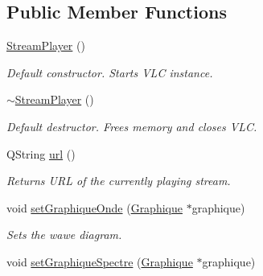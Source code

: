 \subsection*{Public Member Functions}
\begin{DoxyCompactItemize}
\item 
\hypertarget{classStreamPlayer_aba5a4bd0bb0c489e631c1d9aff07db51}{
\hyperlink{classStreamPlayer_aba5a4bd0bb0c489e631c1d9aff07db51}{StreamPlayer} ()}
\label{classStreamPlayer_aba5a4bd0bb0c489e631c1d9aff07db51}

\begin{DoxyCompactList}\small\item\em Default constructor. Starts VLC instance. \item\end{DoxyCompactList}\item 
\hypertarget{classStreamPlayer_a3e93a68113a1a69b912ae92aa18c783e}{
\hyperlink{classStreamPlayer_a3e93a68113a1a69b912ae92aa18c783e}{$\sim$StreamPlayer} ()}
\label{classStreamPlayer_a3e93a68113a1a69b912ae92aa18c783e}

\begin{DoxyCompactList}\small\item\em Default destructor. Frees memory and closes VLC. \item\end{DoxyCompactList}\item 
\hypertarget{classStreamPlayer_a12022327862e7ca45580d0a01aa80822}{
QString \hyperlink{classStreamPlayer_a12022327862e7ca45580d0a01aa80822}{url} ()}
\label{classStreamPlayer_a12022327862e7ca45580d0a01aa80822}

\begin{DoxyCompactList}\small\item\em Returns URL of the currently playing stream. \item\end{DoxyCompactList}\item 
\hypertarget{classStreamPlayer_ae55ce61bf86075e9d1373149a29a2238}{
void \hyperlink{classStreamPlayer_ae55ce61bf86075e9d1373149a29a2238}{setGraphiqueOnde} (\hyperlink{classGraphique}{Graphique} $\ast$graphique)}
\label{classStreamPlayer_ae55ce61bf86075e9d1373149a29a2238}

\begin{DoxyCompactList}\small\item\em Sets the wawe diagram. \item\end{DoxyCompactList}\item 
\hypertarget{classStreamPlayer_a7c2c75b36f5fc0131532cc2ef02e9920}{
void \hyperlink{classStreamPlayer_a7c2c75b36f5fc0131532cc2ef02e9920}{setGraphiqueSpectre} (\hyperlink{classGraphique}{Graphique} $\ast$graphique)}
\label{classStreamPlayer_a7c2c75b36f5fc0131532cc2ef02e9920}


\end{DoxyCompactItemize}
